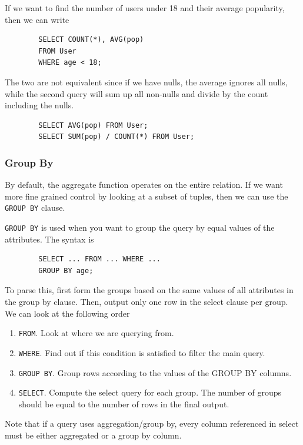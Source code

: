    \begin{example}
      \label{ex:calculate-popularity-within-age-group}
      If we want to find the number of users under 18 and their average popularity, then we can write 
      \begin{lstlisting}
        SELECT COUNT(*), AVG(pop) 
        FROM User 
        WHERE age < 18; 
      \end{lstlisting}
    \end{example}

    \begin{example}
      \label{ex:average-is-not-sum-count}
      The two are not equivalent since if we have nulls, the average ignores all nulls, while the second query will sum up all non-nulls and divide by the count including the nulls. 
      \begin{lstlisting}
        SELECT AVG(pop) FROM User; 
        SELECT SUM(pop) / COUNT(*) FROM User; 
      \end{lstlisting}
    \end{example}

  \subsubsection{Group By} 

    By default, the aggregate function operates on the entire relation. If we want more fine grained control by looking at a subset of tuples, then we can use the \texttt{GROUP BY} clause. 

    \begin{definition}
      \label{def:group-by}
      \texttt{GROUP BY} is used when you want to group the query by equal values of the attributes. The syntax is 
      \begin{lstlisting}
        SELECT ... FROM ... WHERE ... 
        GROUP BY age; 
      \end{lstlisting}
      To parse this, first form the groups based on the same values of all attributes in the group by clause. Then, output only one row in the select clause per group. We can look at the following order
      \begin{enumerate}
        \item \texttt{FROM}. Look at where we are querying from. 
        \item \texttt{WHERE}. Find out if this condition is satisfied to filter the main query. 
        \item \texttt{GROUP BY}. Group rows according to the values of the GROUP BY columns. 
        \item \texttt{SELECT}. Compute the select query for each group. The number of groups should be equal to the number of rows in the final output. 
      \end{enumerate}
      Note that if a query uses aggregation/group by, every column referenced in select must be either aggregated or a group by column. 
    \end{definition}

